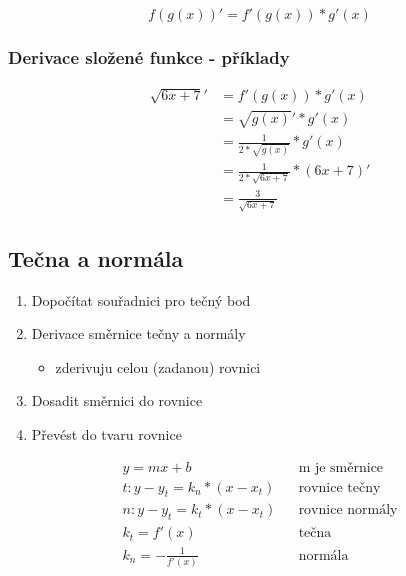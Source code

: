 $$f(g(x))' = f'(g(x))*g'(x)$$
\subsubsection{Derivace složené funkce - příklady}
\begin{align*}
  \sqrt{6x+7}' &= f'(g(x))*g'(x)\\
  &= \sqrt{g(x)}'*g'(x)\\
  &= \frac{1}{2*\sqrt{g(x)}}*g'(x)\\
  &= \frac{1}{2*\sqrt{6x+7}}*(6x+7)'\\
  &= \frac{3}{\sqrt{6x+7}}
\end{align*}
\subsection{Tečna a normála}
\begin{enumerate}
  \item Dopočítat souřadnici pro tečný bod
  \item Derivace směrnice tečny a normály
    \begin{itemize}
      \item zderivuju celou (zadanou) rovnici
    \end{itemize}
  \item Dosadit směrnici do rovnice
  \item Převést do tvaru rovnice
\end{enumerate}
\begin{eqnarray*}
  y = mx+b & & \text{m je směrnice} \\
  t: y-y_t=k_n*(x-x_t) & & \text{rovnice tečny} \\
  n: y-y_t=k_t*(x-x_t) & & \text{rovnice normály} \\
  k_t = f'(x) & & \text{tečna} \\
  k_n = -\frac{1}{f'(x)} & & \text{normála}
\end{eqnarray*}
